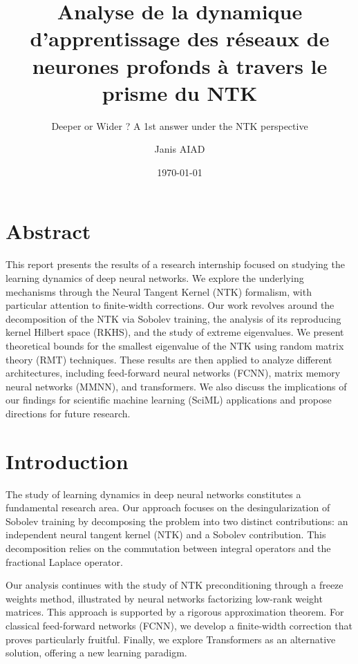 \documentclass[a4paper]{article}
\author{Janis AIAD}
\date{\today}
\title{Analyse de la dynamique d'apprentissage des réseaux de neurones profonds à travers le prisme du NTK}
\subtitle{Deeper or Wider ? A 1st answer under the NTK perspective}
\begin{document}
	\maketitle 
	
	\tableofcontents
\newpage

\section*{Abstract}
This report presents the results of a research internship focused on studying the learning dynamics of deep neural networks. We explore the underlying mechanisms through the Neural Tangent Kernel (NTK) formalism, with particular attention to finite-width corrections. Our work revolves around the decomposition of the NTK via Sobolev training, the analysis of its reproducing kernel Hilbert space (RKHS), and the study of extreme eigenvalues. We present theoretical bounds for the smallest eigenvalue of the NTK using random matrix theory (RMT) techniques. These results are then applied to analyze different architectures, including feed-forward neural networks (FCNN), matrix memory neural networks (MMNN), and transformers. We also discuss the implications of our findings for scientific machine learning (SciML) applications and propose directions for future research.

\newpage
{}


\newpage
{}
\section*{Introduction}
The study of learning dynamics in deep neural networks constitutes a fundamental research area. Our approach focuses on the desingularization of Sobolev training by decomposing the problem into two distinct contributions: an independent neural tangent kernel (NTK) and a Sobolev contribution. This decomposition relies on the commutation between integral operators and the fractional Laplace operator.

Our analysis continues with the study of NTK preconditioning through a freeze weights method, illustrated by neural networks factorizing low-rank weight matrices. This approach is supported by a rigorous approximation theorem. For classical feed-forward networks (FCNN), we develop a finite-width correction that proves particularly fruitful. Finally, we explore Transformers as an alternative solution, offering a new learning paradigm.
\end{document}
